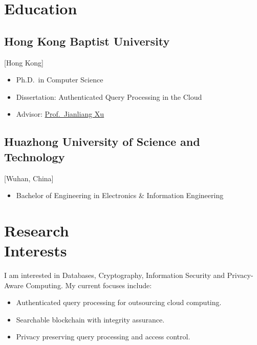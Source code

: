 \documentclass{mycv}
\begin{document}
\maketitle%

\section{Education}

\subsection{Hong Kong Baptist University}[Hong Kong]
\vspace{-\parskip}%
\begin{itemize}[label={}]
  \item Ph.D.\ in Computer Science 
  \item Dissertation: Authenticated Query Processing in the Cloud
  \item Advisor: \href{https://www.comp.hkbu.edu.hk/~xujl}{Prof.~Jianliang Xu}
\end{itemize}

\subsection{Huazhong University of Science and Technology}[Wuhan, China]
\vspace{-\parskip}%
\begin{itemize}[label={}]
  \item Bachelor of Engineering in Electronics \& Information Engineering 
\end{itemize}

\section{Research \\ Interests}

I am interested in Databases, Cryptography, Information Security and Privacy-Aware Computing. My current focuses include:

\begin{itemize}
  \item Authenticated query processing for outsourcing cloud computing.
  \item Searchable blockchain with integrity assurance.
  \item Privacy preserving query processing and access control.
\end{itemize}
\end{document}
